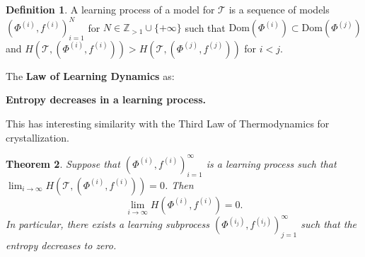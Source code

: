 \documentclass{article}
\theoremstyle{plain}
\newtheorem{theorem}{Theorem}[section]
\theoremstyle{definition}
\newtheorem{definition}[theorem]{Definition}
\theoremstyle{remark}
\newcommand{\Z}{\mathbb{Z}}
\newcommand{\cT}{\mathcal{T}}
\begin{document}
\begin{definition}
	A learning process of a model for $\cT$ is a sequence of models $(\Phi^{(i)},f^{(i)})_{i=1}^N$ for $N \in \Z_{>1} \cup \{+\infty\}$ such that $\mathrm{Dom}(\Phi^{(i)}) \subset \mathrm{Dom}(\Phi^{(j)})$ and $H(\cT,(\Phi^{(i)},f^{(i)})) > H(\cT,(\Phi^{(j)},f^{(j)}))$ for $i<j$.
\end{definition}

The \textbf{Law of Learning Dynamics} as:
\begin{center}
	\textbf{Entropy decreases in a learning process.}
\end{center}
This has interesting similarity with the Third Law of Thermodynamics for crystallization.

\begin{theorem} \label{thm:law_single}
	Suppose that $(\Phi^{(i)},f^{(i)})_{i=1}^\infty$ is a learning process such that $\lim_{i\to\infty} H(\cT,(\Phi^{(i)},f^{(i)})) = 0$. Then 
	$$\lim_{i\to\infty} H(\Phi^{(i)},f^{(i)}) = 0.$$
	In particular, there exists a learning subprocess $(\Phi^{(i_j)},f^{(i_j)})_{j=1}^\infty$ such that the entropy decreases to zero.
\end{theorem}
\end{document}
